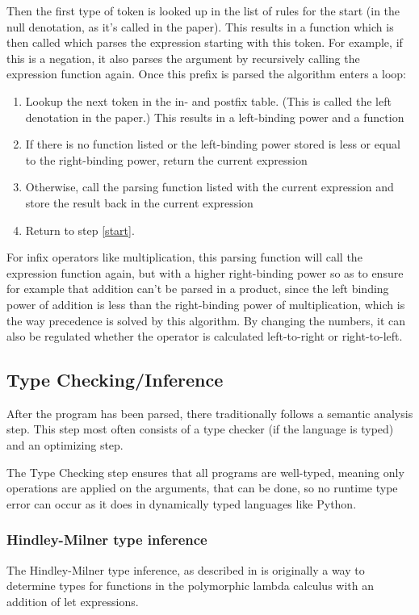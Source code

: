 \documentclass[12pt]{article}
\begin{document}
Then the first type of token is looked up
in the list of rules for the start
(in the null denotation, as it's called in the paper).
This results in a function which is then called
which parses the expression starting with this token.
For example, if this is a negation, it also parses the argument
by recursively calling the expression function again.
Once this prefix is parsed the algorithm enters a loop:
\begin{enumerate}
	\item \label{start}
	      Lookup the next token in the in- and postfix table.
	      (This is called the left denotation in the paper.)
	      This results in a left-binding power and a function
	\item If there is no function listed or
	      the left-binding power stored is less or equal
	      to the right-binding power, return the current expression
	\item Otherwise, call the parsing function listed with the current expression
	      and store the result back in the current expression
	\item Return to step \ref{start}.
\end{enumerate}
For infix operators like multiplication, this parsing function
will call the expression function again, but with a higher right-binding power
so as to ensure for example that addition can't be parsed in a product,
since the left binding power of addition is less than
the right-binding power of multiplication,
which is the way precedence is solved by this algorithm.
By changing the numbers, it can also be regulated whether the operator
is calculated left-to-right or right-to-left.

\subsection{Type Checking/Inference}
After the program has been parsed, there traditionally follows
a semantic analysis step. This step most often consists of a type checker
(if the language is typed) and an optimizing step.

The Type Checking step ensures that all programs are well-typed,
meaning only operations are applied on the arguments, that can
be done, so no runtime type error can occur as it does in dynamically typed
languages like Python.

\subsubsection{Hindley-Milner type inference}
The Hindley-Milner type inference, as described in
\autocite{damasPrincipalTypeschemesFunctional1982}
is originally a way to determine types for functions in the
polymorphic lambda calculus with an addition of let expressions.
\end{document}

